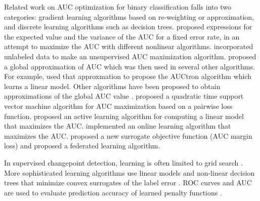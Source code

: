 \documentclass{article}
\begin{document}

Related work on AUC optimization for binary classification falls into two categories: gradient
learning algorithms based on re-weighting or approximation, and
discrete learning algorithms such as decision trees.
\citet{ferri2002learning, cortes2004auc} proposed expressions for the expected value
and the variance of the AUC for a fixed error rate, in an attempt to maximize the AUC with different nonlinear algorithms.
\citet{wang2015optimizing} incorporated unlabeled data to make an unsupervised AUC maximization algorithm.
\citet{yan2003optimizing} proposed a global approximation of AUC which was then used in several other algorithms.
For example, \citet{castro2008optimization} used that approxmation to propose the AUCtron algorithm which learns a linear model.
Other algorithms have been proposed to obtain approximations of the global AUC value \citep{ rakotomamonjy2004optimizing, herschtal2004optimising, herschtal2006area, calders2007efficient}.
\citet{joachims2005multivariate} proposed a quadratic time support vector machine algorithm for AUC maximization based on a pairwise loss function.
\citet{Han2010} proposed an active learning algorithm for computing a linear model that maximizes the AUC.
\citet{zhao2011online} implemented an online learning algorithm that maximizes the AUC.
\citet{yuan2020auc} proposed a new surrogate objective function (AUC margin loss) and \citet{yuan2021federated} proposed a federated learning algorithm.

In supervised changepoint detection, learning is often limited to grid search \citep{Hocking2013bioinformatics, Hocking2017bioinfo, Liehrmann2021chipseq}. 
More sophisticated learning algorithms use linear models and non-linear decision trees that minimize convex surrogates of the label error \citep{Hocking2013icml, Hocking2014,  Hocking2015, Drouin2017, Hocking2020psb}.
ROC curves and AUC are used to evaluate prediction accuracy of learned penalty functions \citep{Maidstone2016, Hocking2020jmlr}.


\end{document}
